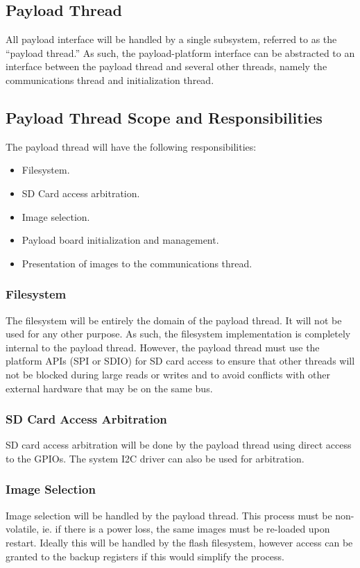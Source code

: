 \documentclass[10pt]{extarticle}
\begin{document}
\subsection{Payload Thread}
All payload interface will be handled by a single subsystem, referred to as the
``payload thread.'' As such, the payload-platform interface can be abstracted
to an interface between the payload thread and several other threads, namely
the communications thread and initialization thread.

\subsection{Payload Thread Scope and Responsibilities}
The payload thread will have the following responsibilities:
\begin{itemize}
    \item Filesystem.
    \item SD Card access arbitration.
    \item Image selection.
    \item Payload board initialization and management.
    \item Presentation of images to the communications thread.
\end{itemize}

\subsubsection{Filesystem}
The filesystem will be entirely the domain of the payload thread. It will not be
used for any other purpose. As such, the filesystem implementation is completely
internal to the payload thread. However, the payload thread must use the
platform APIs (SPI or SDIO) for SD card access to ensure that other threads will not be blocked
during large reads or writes and to avoid conflicts with other external hardware
that may be on the same bus.

\subsubsection{SD Card Access Arbitration}
SD card access arbitration will be done by the payload thread using direct access
to the GPIOs. The system I2C driver can also be used for arbitration.

\subsubsection{Image Selection}
Image selection will be handled by the payload thread. This process must be
non-volatile, ie. if there is a power loss, the same images must be re-loaded
upon restart. Ideally this will be handled by the flash filesystem, however
access can be granted to the backup registers if this would simplify the
process.
\end{document}
